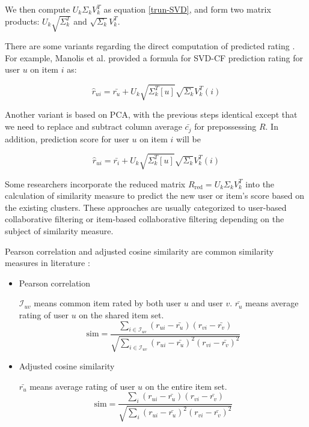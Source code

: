 \documentclass[letter paper, 11pt]{article}
\begin{document}
	We then compute $U_k \Sigma_k V_k^T$ as equation \ref{trun-SVD}, and form two matrix products: $U_k \sqrt{\Sigma_k^T}$ and $\sqrt{\Sigma_k} V_k^T$.
	
	There are some variants regarding the direct computation of predicted rating \cite{ApplySVD} \cite{SVD-performance}. For example, Manolis et al. \cite{SVD-performance} provided a formula for SVD-CF prediction rating for user $u$ on item $i$ as:
	
	\begin{equation}
		\hat{r}_{ui} = \bar{r_u} + U_k \sqrt{\Sigma_k^T [u]} \sqrt{\Sigma_k} V_k^T (i)
	\end{equation}
	
	Another variant is based on PCA, with the previous steps identical except that we need to replace and subtract column average $\bar{c_j}$ for prepossessing $R$. In addition, prediction score for user $u$ on item $i$ will be
	
	\begin{equation}
		\hat{r}_{ui} = \bar{r_i} + U_k \sqrt{\Sigma_k^T [u]} \sqrt{\Sigma_k} V_k^T (i)
	\end{equation}

	Some researchers incorporate the reduced matrix $R_{\text{red}} = U_k \Sigma_k V_k^T$ into the calculation of similarity measure to predict the new user or item's score based on the existing clusters. These approaches are usually categorized to user-based collaborative filtering or item-based collaborative filtering depending on the subject of similarity measure.
	
	
	Pearson correlation and adjusted cosine similarity are common similarity measures in literature\cite{CF}\cite{ApplySVD} \cite{new-sim} \cite{sim-CF} \cite{CF-sign}:
	\begin{itemize}
		\item Pearson correlation
		
		$\mathcal{I}_{uv}$ means common item rated by both user $u$ and user $v$. $\bar{r_u}$ means average rating of user $u$ on the shared item set.
		\begin{equation}
			\text{sim} = \frac{\sum_{i \in \mathcal{I}_{uv}}(r_{ui} - \bar{r_u})(r_{vi} - \bar{r_v})}{\sqrt{\sum_{i \in \mathcal{I}_{uv}}(r_{ui} - \bar{r_u})^2(r_{vi} - \bar{r_v})^2}}
		\end{equation}
		
		\item Adjusted cosine similarity
		
		$\bar{r_u}$ means average rating of user $u$ on the entire item set.
		\begin{equation}
			\text{sim} = \frac{\sum_{i}(r_{ui} - \bar{r_u})(r_{vi} - \bar{r_v})}{\sqrt{\sum_{i}(r_{ui} - \bar{r_u})^2(r_{vi} - \bar{r_v})^2}}
		\end{equation}
	
	\end{itemize}
\end{document}
